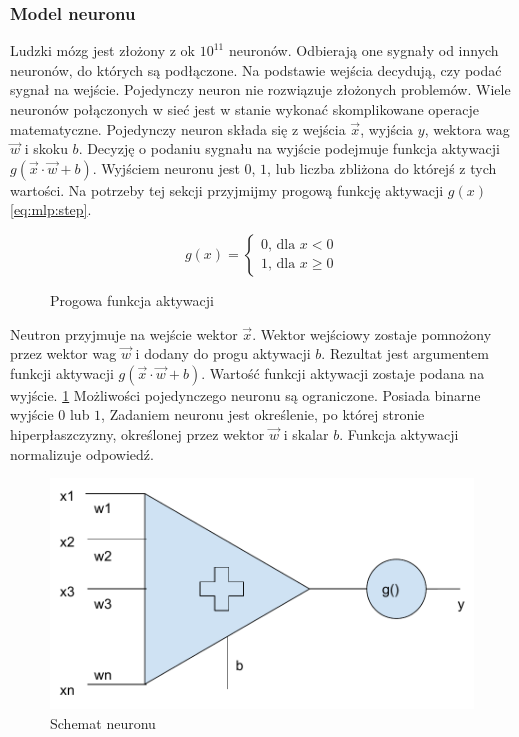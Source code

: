 \documentclass[a4paper,12pt,twoside,openany]{report}
\begin{document}
\begin{enumerate}
\subsubsection{Model neuronu}
Ludzki mózg jest złożony z ok $10^{11}$ neuronów.
Odbierają one sygnały od innych neuronów, do których są podłączone.
Na podstawie wejścia decydują, czy podać sygnał na wejście.
Pojedynczy neuron nie rozwiązuje złożonych problemów.
Wiele neuronów połączonych w sieć jest w stanie wykonać skomplikowane operacje matematyczne.
Pojedynczy neuron składa się z wejścia $\vec{x}$, wyjścia $y$, wektora wag $\vec{w}$ i skoku $b$.
Decyzję o podaniu sygnału na wyjście podejmuje funkcja aktywacji $g(\vec{x} \cdot \vec{w} + b)$.
Wyjściem neuronu jest $0$, $1$, lub liczba zbliżona do którejś z tych wartości.
Na potrzeby tej sekcji przyjmijmy progową funkcję aktywacji $g(x)$ \ref{eq:mlp:step}.
\begin{figure}[hc]
	\begin{equation}
		\label{eq:mlp:step}
	g(x)={\begin{cases}0{\text{, dla }}x<0\\1{\text{, dla }}x\geq 0\end{cases}}
	\end{equation}
	\caption{Progowa funkcja aktywacji}
\end{figure}
Neutron przyjmuje na wejście wektor $\vec{x}$.
Wektor wejściowy zostaje pomnożony przez wektor wag $\vec{w}$ i dodany do progu aktywacji $b$.
Rezultat jest argumentem funkcji aktywacji  $g(\vec{x} \cdot \vec{w} + b)$.
Wartość funkcji aktywacji zostaje podana na wyjście. \ref{rys:mlp:neuron}
Możliwości pojedynczego neuronu są ograniczone. 
Posiada binarne wyjście $0$ lub $1$, 
Zadaniem neuronu jest określenie, po której stronie hiperpłaszczyzny, 
określonej przez wektor $\vec w$ i skalar $b$.
Funkcja aktywacji normalizuje odpowiedź.
\begin{figure}[h]
	\centering
	\includegraphics[width=\textwidth]{neuron}
	\caption{Schemat neuronu}
	\label{rys:mlp:neuron}
\end{figure}


\end{enumerate}
\end{document}
